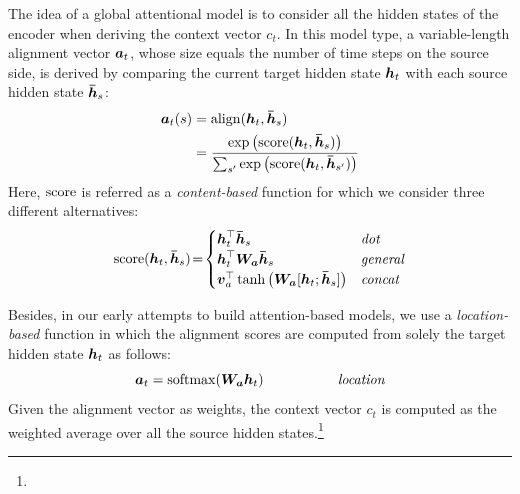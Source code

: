 The idea of a global attentional model is to consider all the hidden states of
the encoder when deriving the context vector $c_t$. In this model type, a
variable-length alignment vector $\mbox{\boldmath{$a$}}_{t}$, whose size equals the number of time
steps on the source side, is derived by comparing the current target hidden
state $\mbox{\boldmath{$h$}}_{t}$ with each source hidden state $\mbox{\boldmath{$\bar{h}$}}_{s}$:
\begin{align}
\label{e:al}
\mbox{\boldmath{$a$}}_{t}(s)&=\operatorname{align}(\mbox{\boldmath{$h$}}_{t}, \mbox{\boldmath{$\bar{h}$}}_{s}) \\
&=\frac{\exp \left(\operatorname{score}(\mbox{\boldmath{$h$}}_{t}, \mbox{\boldmath{$\bar{h}$}}_{s})\right)}{\sum_{s'} \exp \left(\operatorname{score}(\mbox{\boldmath{$h$}}_{t},
\mbox{\boldmath{$\bar{h}$}}_{s'})\right)} \notag
\end{align}
Here, $\operatorname{score}$ is referred as a {\it content-based} function for which we consider three different
alternatives:
\begin{equation*}
\operatorname{score}(\mbox{\boldmath{$h$}}_{t}, \mbox{\boldmath{$\bar{h}$}}_{s})\!=\!\begin{cases}
    \mbox{\boldmath{$h$}}_{t}^\top \mbox{\boldmath{$\bar{h}$}}_{s} & \mbox{{\it dot}}\\
    \mbox{\boldmath{$h$}}_{t}^\top \mbox{\boldmath{$W_a$}} \mbox{\boldmath{$\bar{h}$}}_{s} & \mbox{{\it general}} \\
    \mbox{\boldmath{$v$}}_a^\top\tanh\left(\mbox{\boldmath{$W_a$}} [\mbox{\boldmath{$h$}}_{t}; \mbox{\boldmath{$\bar{h}$}}_{s}]\right) & \mbox{{\it concat}}
\end{cases}
\end{equation*}

Besides, in our early attempts to build attention-based models, we use
a {\it location-based} function in which the alignment scores are
computed from solely the target hidden state $\mbox{\boldmath{$h$}}_{t}$ as
follows:
\begin{equation}
\mbox{\boldmath{$a$}}_{t} = \operatorname{softmax}(\mbox{\boldmath{$W_{a}$}}\mbox{\boldmath{$h$}}_{t}) \mbox{ } \mbox{ } \mbox{ } \mbox{ } \mbox{ } \mbox{ } \mbox{ } \mbox{ } \mbox{ } \mbox{ } \mbox{ } \mbox{ } \mbox{ } \mbox{ } \mbox{ } \mbox{ } \mbox{{\it location}}
\label{e:location}
\end{equation}
Given the alignment vector as weights, the
context vector $c_t$ is computed as the  weighted average over all the source hidden states.\footnote{}

